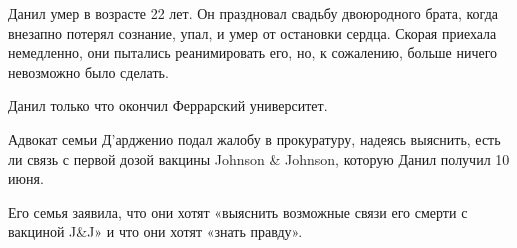 Данил умер в возрасте 22 лет. Он праздновал свадьбу двоюродного брата, когда
внезапно потерял сознание, упал, и умер от остановки сердца. Скорая приехала
немедленно, они пытались реанимировать его, но, к сожалению, больше ничего
невозможно было сделать.

Данил только что окончил Феррарский университет.

Адвокат семьи Д'ардженио подал жалобу в прокуратуру, надеясь выяснить, есть ли
связь с первой дозой вакцины Johnson \& Johnson, которую Данил получил 10 июня.

Его семья заявила, что они хотят «выяснить возможные связи его смерти с вакциной
J\&J» и что они хотят «знать правду».

